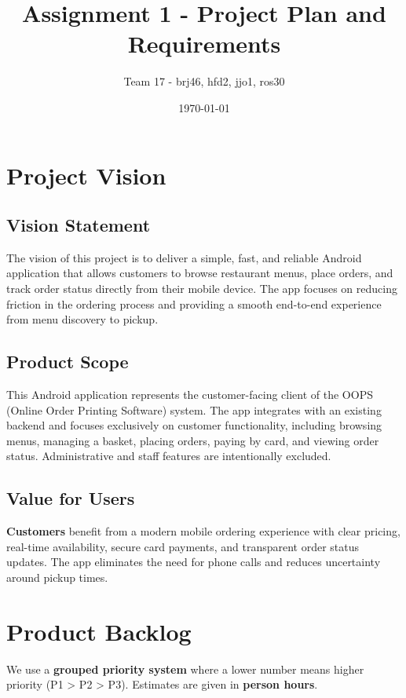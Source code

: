 \documentclass{article}
\title{Assignment 1 - Project Plan and Requirements}
\author{Team 17 - brj46, hfd2, jjo1, ros30}
\date{\today}
\begin{document}
\maketitle

\section{Project Vision}

\subsection{Vision Statement}
The vision of this project is to deliver a simple, fast, and reliable Android application that allows customers to browse restaurant menus, place orders, and track order status directly from their mobile device. The app focuses on reducing friction in the ordering process and providing a smooth end-to-end experience from menu discovery to pickup.

\subsection{Product Scope}
This Android application represents the customer-facing client of the OOPS (Online Order Printing Software) system. The app integrates with an existing backend and focuses exclusively on customer functionality, including browsing menus, managing a basket, placing orders, paying by card, and viewing order status. Administrative and staff features are intentionally excluded.

\subsection{Value for Users}
\textbf{Customers} benefit from a modern mobile ordering experience with clear pricing, real-time availability, secure card payments, and transparent order status updates. The app eliminates the need for phone calls and reduces uncertainty around pickup times.

\section{Product Backlog}
We use a \textbf{grouped priority system} where a lower number means higher priority (P1 > P2 > P3).
Estimates are given in \textbf{person hours}.
\end{document}
